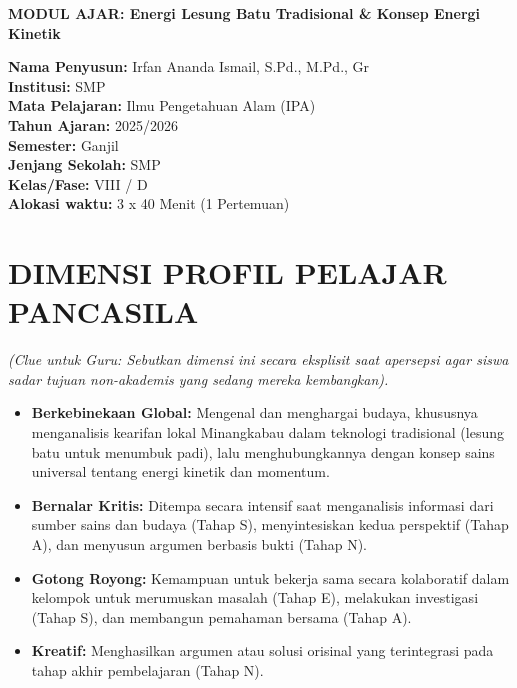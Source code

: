 \documentclass[a4paper,12pt]{article}
\begin{document}
\begin{center}
{\Large\textbf{MODUL AJAR: Energi Lesung Batu Tradisional \& Konsep Energi Kinetik}}
\end{center}

\vspace{0.5cm}

\begin{tcolorbox}[mainbox]
\textbf{Nama Penyusun:} Irfan Ananda Ismail, S.Pd., M.Pd., Gr \\
\textbf{Institusi:} SMP \\
\textbf{Mata Pelajaran:} Ilmu Pengetahuan Alam (IPA) \\
\textbf{Tahun Ajaran:} 2025/2026 \\
\textbf{Semester:} Ganjil \\
\textbf{Jenjang Sekolah:} SMP \\
\textbf{Kelas/Fase:} VIII / D \\
\textbf{Alokasi waktu:} 3 x 40 Menit (1 Pertemuan)
\end{tcolorbox}

\section{DIMENSI PROFIL PELAJAR PANCASILA}
\textit{(Clue untuk Guru: Sebutkan dimensi ini secara eksplisit saat apersepsi agar siswa sadar tujuan non-akademis yang sedang mereka kembangkan).}

\begin{itemize}
\item \textbf{Berkebinekaan Global:} Mengenal dan menghargai budaya, khususnya menganalisis kearifan lokal Minangkabau dalam teknologi tradisional (lesung batu untuk menumbuk padi), lalu menghubungkannya dengan konsep sains universal tentang energi kinetik dan momentum.
\item \textbf{Bernalar Kritis:} Ditempa secara intensif saat menganalisis informasi dari sumber sains dan budaya (Tahap S), menyintesiskan kedua perspektif (Tahap A), dan menyusun argumen berbasis bukti (Tahap N).
\item \textbf{Gotong Royong:} Kemampuan untuk bekerja sama secara kolaboratif dalam kelompok untuk merumuskan masalah (Tahap E), melakukan investigasi (Tahap S), dan membangun pemahaman bersama (Tahap A).
\item \textbf{Kreatif:} Menghasilkan argumen atau solusi orisinal yang terintegrasi pada tahap akhir pembelajaran (Tahap N).
\end{itemize}
\end{document}
